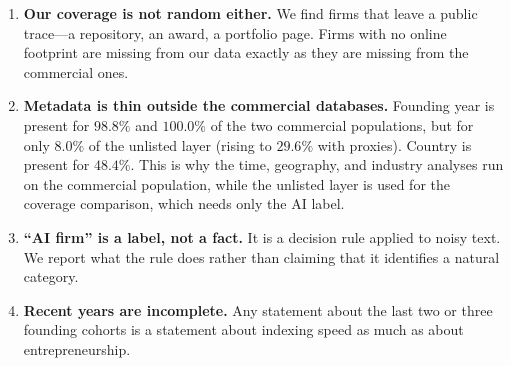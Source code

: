 \documentclass[11pt]{article}
\begin{document}
\begin{enumerate}[leftmargin=1.4em, itemsep=3pt]
  \item \textbf{Our coverage is not random either.} We find firms that leave
        a public trace---a repository, an award, a portfolio page. Firms with no
        online footprint are missing from our data exactly as they are missing
        from the commercial ones.
  \item \textbf{Metadata is thin outside the commercial databases.} Founding
        year is present for $98.8\%$ and $100.0\%$ of the two commercial
        populations, but for only $8.0\%$ of the unlisted layer (rising to
        $29.6\%$ with proxies). Country is present for $48.4\%$. This is why the
        time, geography, and industry analyses run on the commercial population,
        while the unlisted layer is used for the coverage comparison, which needs
        only the AI label.
  \item \textbf{``AI firm'' is a label, not a fact.} It is a decision rule
        applied to noisy text. We report what the rule does rather than claiming
        that it identifies a natural category.
  \item \textbf{Recent years are incomplete.} Any statement about the last two or
        three founding cohorts is a statement about indexing speed as much as
        about entrepreneurship.
\end{enumerate}


\end{document}

